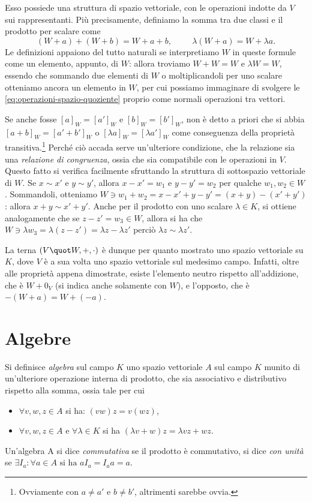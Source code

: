 Esso possiede una struttura di spazio vettoriale, con le operazioni indotte da $V$ sui rappresentanti.
Più precisamente, definiamo la somma tra due classi e il prodotto per scalare come
\begin{equation}
	(W+a)+(W+b)=W+a+b,\hspace{1cm}\lambda(W+a)=W+\lambda a.
	\label{eq:operazioni-spazio-quoziente}
\end{equation}
Le definizioni appaiono del tutto naturali se interpretiamo $W$ in queste formule come un elemento, appunto, di $W$: allora troviamo $W+W=W$ e $\lambda W=W$, essendo che sommando due elementi di $W$ o moltiplicandoli per uno scalare otteniamo ancora un elemento in $W$, per cui possiamo immaginare di svolgere le \eqref{eq:operazioni-spazio-quoziente} proprio come normali operazioni tra vettori.

\begin{osservazione} \label{o:spazio-quoziente-congruenza}
	Se anche fosse $[a]_W=[a']_W$ e $[b]_W=[b']_W$, non è detto a priori che si abbia $[a+b]_W=[a'+b']_W$ o $[\lambda a]_W=[\lambda a']_W$ come conseguenza della proprietà transitiva.\footnote{Ovviamente con $a\ne a'$ e $b\ne b'$, altrimenti sarebbe ovvia.}
	Perché ciò accada serve un'ulteriore condizione, che la relazione sia una \emph{relazione di congruenza}, ossia che sia compatibile con le operazioni in $V$.
	Questo fatto si verifica facilmente sfruttando la struttura di sottospazio vettoriale di $W$.
	Se $x\sim x'$ e $y\sim y'$, allora $x-x'=w_1$ e $y-y'=w_2$ per qualche $w_1,w_2\in W$.
	Sommandoli, otteniamo $W\ni w_1+w_2=x-x'+y-y'=(x+y)-(x'+y')$: allora $x+y\sim x'+y'$.
	Anche per il prodotto con uno scalare $\lambda\in K$, si ottiene analogamente che se $z-z'=w_3\in W$, allora si ha che $W\ni\lambda w_3=\lambda(z-z')=\lambda z-\lambda z'$ perciò $\lambda z\sim \lambda z'$.
\end{osservazione}

La terna $(V\quot W,+,\cdot)$ è dunque per quanto mostrato uno spazio vettoriale su $K$, dove $V$ è a sua volta uno spazio vettoriale sul medesimo campo.
Infatti, oltre alle proprietà appena dimostrate, esiste l'elemento neutro rispetto all'addizione, che è $W+0_V$ (si indica anche solamente con $W$), e l'opposto, che è $-(W+a)=W+(-a)$.

\section{Algebre}
\begin{definizione} \label{d:algebra}
	Si definisce \emph{algebra} sul campo $K$ uno spazio vettoriale $A$ sul campo $K$ munito di un'ulteriore operazione interna di prodotto, che sia associativo e distributivo rispetto alla somma, ossia tale per cui
	\begin{itemize}
		\item $\forall v,w,z\in A$ si ha: $(v w) z = v (w z)$,
		\item $\forall v,w,z\in A$ e $\forall \lambda\in K$ si ha $(\lambda v + w)z = \lambda v z + w z$.
	\end{itemize}
\end{definizione}
Un'algebra A si dice  \emph{commutativa} se il prodotto è commutativo, si dice \emph{con unità} se $\exists I_a\colon \forall a\in A \text{ si ha } a I_a = I_a a = a$.
